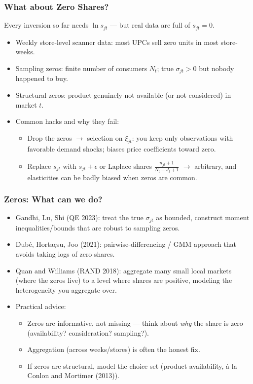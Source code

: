 \documentclass[aspectratio=169,10pt]{beamer}
\begin{document}
\begin{frame}
\frametitle{What about Zero Shares?}
Every inversion so far needs $\ln s_{jt}$ --- but real data are full of $s_{jt}=0$.
\begin{itemize}
\item Weekly store-level scanner data: most UPCs sell zero units in most store-weeks.
\item \alert{Sampling zeros}: finite number of consumers $N_t$; true $\sigma_{jt}>0$ but nobody happened to buy.
\item \alert{Structural zeros}: product genuinely not available (or not considered) in market $t$.
\item Common hacks and why they fail:
\begin{itemize}
\item Drop the zeros $\rightarrow$ \alert{selection on $\xi_{jt}$}: you keep only observations with favorable demand shocks; biases price coefficients toward zero.
\item Replace $s_{jt}$ with $s_{jt} + \epsilon$ or Laplace shares $\frac{n_{jt}+1}{N_t + J_t + 1}$ $\rightarrow$ arbitrary, and elasticities can be badly biased when zeros are common.
\end{itemize}
\end{itemize}
\end{frame}


\begin{frame}
\frametitle{Zeros: What can we do?}
\begin{itemize}
\item Gandhi, Lu, Shi (QE 2023): treat the true $\sigma_{jt}$ as bounded, construct moment inequalities/bounds that are robust to sampling zeros.
\item Dub\'e, Horta\c{c}su, Joo (2021): pairwise-differencing / GMM approach that avoids taking logs of zero shares.
\item Quan and Williams (RAND 2018): aggregate many small local markets (where the zeros live) to a level where shares are positive, modeling the heterogeneity you aggregate over.
\item Practical advice:
\begin{itemize}
\item Zeros are \alert{informative, not missing} --- think about \emph{why} the share is zero (availability? consideration? sampling?).
\item Aggregation (across weeks/stores) is often the honest fix.
\item If zeros are structural, model the choice set (product availability, \`a la Conlon and Mortimer (2013)).
\end{itemize}
\end{itemize}
\end{frame}
\end{document}

